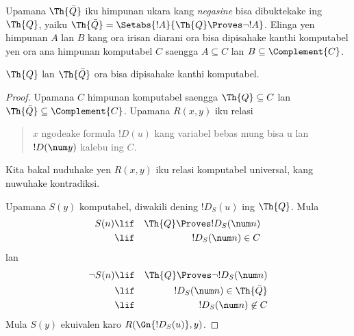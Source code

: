 \documentclass[../../../include/open-logic-section]{subfiles}
\begin{document}



Upamana $\Th{\bar Q}$ iku himpunan ukara kang {\em negasine} bisa
dibuktekake ing $\Th{Q}$, yaiku $\Th{\bar Q} = \Setabs{!A}{\Th{Q} \Proves
  \lnot !A}$. Elinga yen himpunan $A$ lan $B$ kang ora irisan diarani
ora bisa dipisahake kanthi komputabel yen ora ana himpunan komputabel
$C$ saengga $A \subseteq C$ lan $B \subseteq \Complement{C}$.

\begin{lem}
$\Th{Q}$ lan $\Th{\bar Q}$ ora bisa dipisahake kanthi komputabel.
\end{lem}

\begin{proof}
Upamana $C$ himpunan komputabel saengga $\Th{Q} \subseteq C$ lan
$\Th{\bar Q} \subseteq \Complement{C}$. Upamana $R(x,y)$ iku relasi
\begin{quote}
$x$ ngodeake formula $!D(u)$ kang variabel bebas mung bisa u lan $!D(\num y)$ kalebu ing $C$.
\end{quote}
Kita bakal nuduhake yen $R(x,y)$ iku relasi komputabel universal, kang
nuwuhake kontradiksi.

Upamana $S(y)$ komputabel, diwakili dening $!D_S(u)$ ing
$\Th{Q}$. Mula
\begin{eqnarray*}
S(n) & \lif & \Th{Q} \Proves !D_S(\num n) \\
& \lif & !D_S(\num n) \in C
\end{eqnarray*}
lan
\begin{eqnarray*}
\lnot S(n) & \lif & \Th{Q} \Proves \lnot !D_S(\num n) \\
& \lif & !D_S(\num n) \in \Th{\bar Q} \\
& \lif & !D_S(\num n) \not\in C
\end{eqnarray*}
Mula $S(y)$ ekuivalen karo $R(\Gn{!D_S(u)},y)$.
\end{proof}
\end{document}
